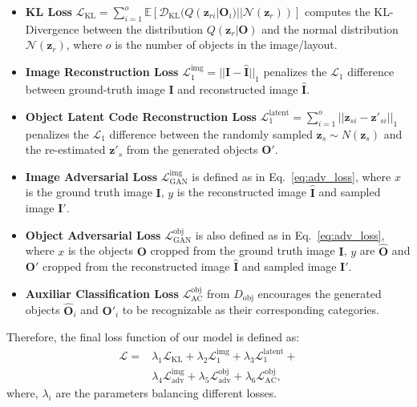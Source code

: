 \documentclass[10pt,twocolumn,letterpaper]{article}
\begin{document}
\begin{itemize}[leftmargin=*]
\setlength{\itemsep}{0pt}
  \item \textbf{KL Loss} $\mathcal{L}_{\mathrm{KL}} = \sum_{i=1}^{o}\mathbb{E}[\mathcal{D}_{\mathrm{KL}}(Q(\mathbf{z}_{ri}|\mathbf{O}_i)||\mathcal{N}(\mathbf{z}_r))]$ computes the KL-Divergence between the distribution $Q(\mathbf{z}_r|\mathbf{O})$ and the normal distribution $\mathcal{N}(\mathbf{z}_r)$, where $o$ is the number of objects in the image/layout. 
  \item \textbf{Image Reconstruction Loss} $\mathcal{L}_1^{\mathrm{img}} = ||\mathbf{I}-\hat{\mathbf{I}}||_1$ penalizes the $\mathcal{L}_1$ difference between ground-truth image $\mathbf{I}$ and reconstructed image $\mathbf{\hat{I}}$. 
  \item \textbf{Object Latent Code Reconstruction Loss} $\mathcal{L}_1^{\mathrm{latent}} = \sum_{i=1}^{o}||\mathbf{z}_{si}-\mathbf{z'}_{si}||_1$ penalizes the $\mathcal{L}_1$ difference between the randomly sampled $\mathbf{z}_{s} \sim N(\mathbf{z}_s)$ and the re-estimated $\mathbf{z}'_s$ from the generated objects $\mathbf{O}'$.
  \item \textbf{Image Adversarial Loss} $\mathcal{L}_{\mathrm{GAN}}^{\mathrm{img}}$ is defined as in Eq.~\eqref{eq:adv_loss}, where $x$ is the ground truth image $\mathbf{I}$, $y$ is the reconstructed image $\mathbf{\hat{I}}$ and sampled image $\mathbf{I'}$.
  \item \textbf{Object Adversarial Loss} $\mathcal{L}_{\mathrm{GAN}}^{\mathrm{obj}}$ is also defined as in Eq.~\eqref{eq:adv_loss}, where $x$ is the objects $\mathbf{O}$ cropped from the ground truth image $\mathbf{I}$, $y$ are $\mathbf{\hat{O}}$ and $\mathbf{O}'$ cropped from the reconstructed image $\mathbf{\hat{I}}$ and sampled image $\mathbf{I}'$.
  \item \textbf{Auxiliar Classification Loss} $\mathcal{L}_\mathrm{AC}^{\mathrm{obj}}$ from $D_\text{obj}$ encourages the generated objects $\mathbf{\hat{O}}_i$ and $\mathbf{O}'_i$ to be recognizable as their corresponding categories.
\end{itemize}



\noindent
Therefore, the final loss function of our model is defined as:
\begin{align}
    \mathcal{L}  = & \lambda_1 \mathcal{L}_{\mathrm{KL}} + \lambda_2 \mathcal{L}_{1}^{\text{img}} + \lambda_3\mathcal{L}_{1}^{\mathrm{latent}} + \nonumber\\
    &\lambda_4 \mathcal{L}_{\mathrm{adv}}^\mathrm{img} + \lambda_5 \mathcal{L}_{\mathrm{adv}}^\mathrm{obj} + \lambda_6 \mathcal{L}_{\mathrm{AC}}^{\mathrm{obj}}, \nonumber
\end{align}
where, $\lambda_i$ are the parameters balancing different losses.
\end{document}
